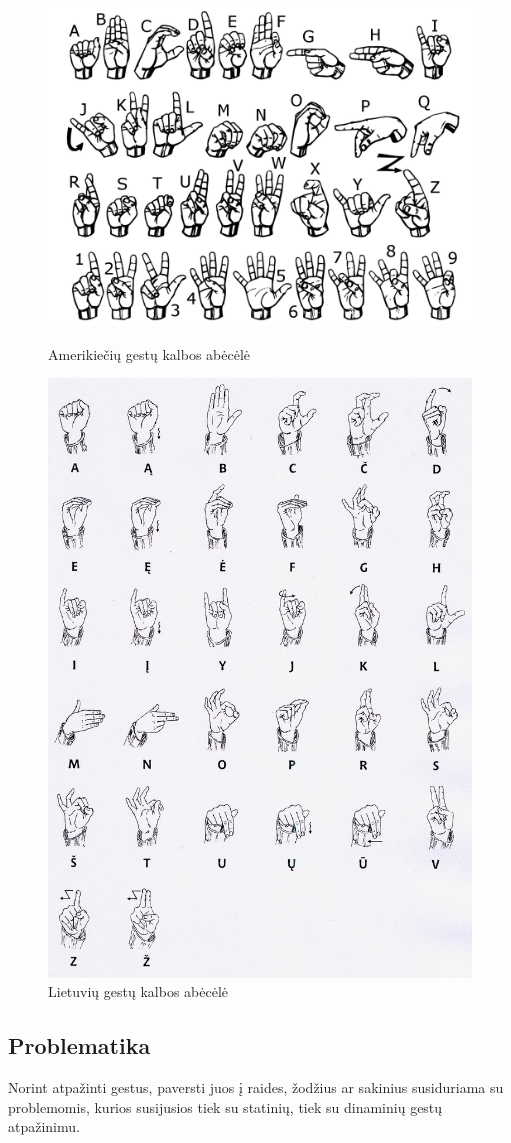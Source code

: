 \documentclass{VUMIFInfKursinis}
\begin{document}
\begin{figure}[H]
	\centering
	\begin{minipage}{.5\textwidth}
		\centering
		\includegraphics[width=.8\linewidth]{img/asl_alphabet}
		\caption[a]{Amerikiečių gestų kalbos abėcėlė\footnotemark}
		\label{img:asl_alphabet}
	\end{minipage}%
	\begin{minipage}{.5\textwidth}
		\centering
		\includegraphics[width=.5\linewidth]{img/lsl_alphabet}
		\caption[b]{Lietuvių gestų kalbos abėcėlė\footnotemark}
		\label{img:lsl_alphabet}
	\end{minipage}
\end{figure}
\subsection{Problematika}
Norint atpažinti gestus, paversti juos į raides, žodžius ar sakinius susiduriama su problemomis, kurios susijusios tiek su statinių, tiek su dinaminių gestų atpažinimu.
\end{document}
